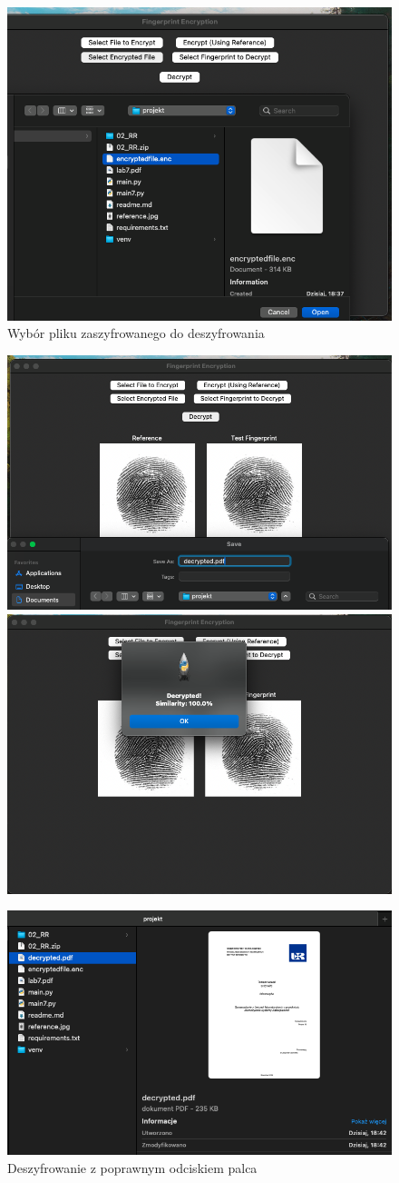 \documentclass{urdpl}     %
\begin{document}
\begin{figure}[H]
	\centering
	\includegraphics[width=0.85\linewidth]{docs/selectEncryptedFile.png}
	\caption*{Wybór pliku zaszyfrowanego do deszyfrowania}
\end{figure}

\begin{figure}[H]
	\centering
	\includegraphics[width=0.49\linewidth]{docs/DecryptedViaValidFingerprint.png}
	\includegraphics[width=0.49\linewidth]{docs/decryptedFileNotify.png}
	
	\vspace{0.5em}
	
	\includegraphics[width=0.85\linewidth]{docs/decryptedFile.png}
	\caption*{Deszyfrowanie z poprawnym odciskiem palca}
\end{figure}
\end{document}
